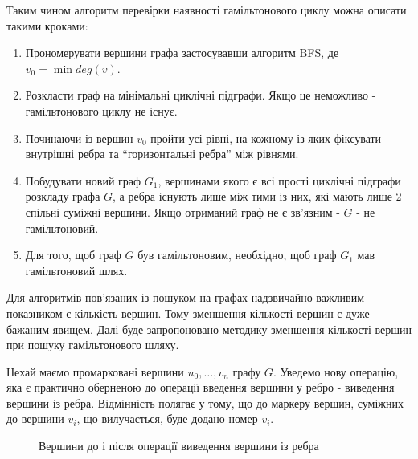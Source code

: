 \documentclass[a4paper,14pt,ukrainian]{extarticle}
\begin{document}
    Таким чином алгоритм перевірки наявності гамільтонового циклу можна описати такими кроками:
    \begin{enumerate}
        \item Прономерувати вершини графа застосувавши алгоритм BFS, де $v_0 = \min{deg(v)}$.
        \item Розкласти граф на мінімальні циклічні підграфи.
            Якщо це неможливо - гамільтонового циклу не існує.
        \item Починаючи із вершин $v_0$ пройти усі рівні, на кожному із яких фіксувати внутрішні ребра та ``горизонтальні ребра'' між рівнями.
        \item Побудувати новий граф $G_1$, вершинами якого є всі прості циклічні підграфи розкладу графа $G$, а ребра існують лише між тими із них, які мають лише 2 спільні суміжні вершини.
            Якщо отриманий граф не є зв’язним - $G$ - не гамільтоновий.
        \item Для того, щоб граф $G$ був гамільтоновим, необхідно, щоб граф $G_1$ мав гамільтоновий шлях.

    \end{enumerate}

    Для алгоритмів пов’язаних із пошуком на графах надзвичайно важливим показником є кількість вершин.
    Тому зменшення кількості вершин є дуже бажаним явищем.
    Далі буде запропоновано методику зменшення кількості вершин при пошуку гамільтонового шляху.

    Нехай маємо промарковані вершини $u_0, \dots , v_n$ графу $G$.
    Уведемо нову операцію, яка є практично оберненою до операції введення вершини у ребро - виведення вершини із ребра.
    Відмінність полягає у тому, що до маркеру вершин, суміжних до вершини $v_i$, що вилучається, буде додано номер $v_i$.
    \begin{figure}[h]
        \caption{Вершини до і після операції виведення вершини із ребра}
        \centering
        \hspace{2cm}
    \end{figure}
\end{document}
